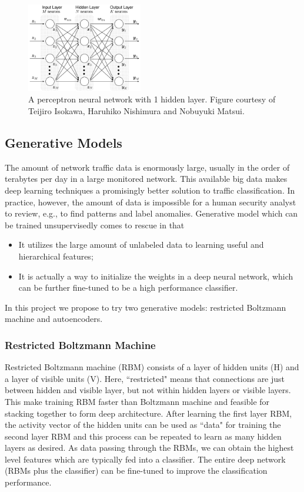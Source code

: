 \begin{figure}[h]
\centering
\includegraphics[width=0.45\textwidth]{figures/multilayer_perceptron.png}
\caption{A perceptron neural network with 1 hidden layer.
        Figure courtesy of Teijiro Isokawa, Haruhiko Nishimura and Nobuyuki Matsui.}
\label{Fig:MLPArchitecture}
\end{figure}

\subsection{Generative Models}
The amount of network traffic data is enormously large, usually in the order of terabytes
per day in a large monitored network.
This available big data makes deep learning techniques a promisingly better solution
to traffic classification.
In practice, however, the amount of data is impossible for a human security analyst to review,
e.g., to find patterns and label anomalies.
Generative model which can be trained unsupervisedly comes to rescue in that
\begin{itemize}
\item It utilizes the large amount of unlabeled data to learning useful and hierarchical features;
\item It is actually a way to initialize the weights in a deep neural network, which can be
        further fine-tuned to be a high performance classifier.
\end{itemize}
In this project we propose to try two generative models: restricted Boltzmann machine and autoencoders.

\subsubsection{Restricted Boltzmann Machine}
Restricted Boltzmann machine (RBM) consists of a layer of hidden units (H) and a layer of visible units (V).
Here, ``restricted" means that connections are just between hidden and visible layer,
but not within hidden layers or visible layers.
This make training RBM faster than Boltzmann machine and feasible for stacking together
to form deep architecture.
After learning the first layer RBM, the activity vector of the hidden units can be used
as ``data" for training the second layer RBM
and this process can be repeated to learn as many hidden layers as desired.
As data passing through the RBMs, we can obtain the highest level features 
which are typically fed into a classifier.
The entire deep network (RBMs plus the classifier) can be fine-tuned to
improve the classification performance.

